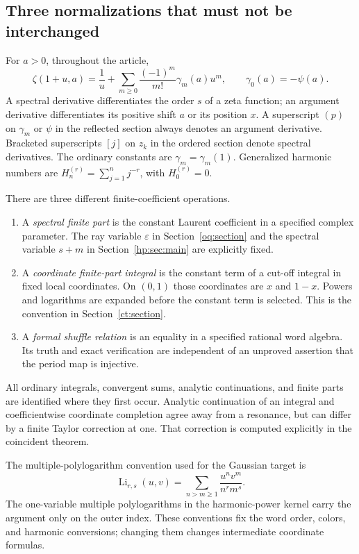 \subsection{Three normalizations that must not be interchanged}

For $a>0$, throughout the article,
\[
 \zeta(1+u,a)=\frac1u+
       \sum_{m\ge0}\frac{(-1)^m}{m!}\gamma_m(a)u^m,
 \qquad \gamma_0(a)=-\psi(a).
\]
A spectral derivative differentiates the order $s$ of a zeta function;
an argument derivative differentiates its positive shift $a$ or its
position $x$. A superscript $(p)$ on $\gamma_m$ or $\psi$ in the
reflected section always denotes an argument derivative. Bracketed
superscripts $[j]$ on $z_k$ in the ordered section denote spectral
derivatives. The ordinary constants are $\gamma_m=\gamma_m(1)$.
Generalized harmonic numbers are
$H_n^{(r)}=\sum_{j=1}^n j^{-r}$, with $H_0^{(r)}=0$.

There are three different finite-coefficient operations.
\begin{enumerate}
\item A \emph{spectral finite part} is the constant Laurent coefficient
in a specified complex parameter. The ray variable $\varepsilon$ in
Section~\ref{oq:section} and the spectral variable $s+m$ in
Section~\ref{hp:sec:main} are explicitly fixed.
\item A \emph{coordinate finite-part integral} is the constant term of
a cut-off integral in fixed local coordinates. On $(0,1)$ those
coordinates are $x$ and $1-x$. Powers and logarithms are expanded before
the constant term is selected. This is the convention in
Section~\ref{ct:section}.
\item A \emph{formal shuffle relation} is an equality in a specified
rational word algebra. Its truth and exact verification are independent
of an unproved assertion that the period map is injective.
\end{enumerate}
All ordinary integrals, convergent sums, analytic continuations, and
finite parts are identified where they first occur. Analytic continuation
of an integral and coefficientwise coordinate completion agree away
from a resonance, but can differ by a finite Taylor correction at one.
That correction is computed explicitly in the coincident theorem.

The multiple-polylogarithm convention used for the Gaussian target is
\[
 \operatorname{Li}_{r,s}(u,v)
 =\sum_{n>m\ge1}\frac{u^nv^m}{n^rm^s}.
\]
The one-variable multiple polylogarithms in the harmonic-power kernel
carry the argument only on the outer index. These conventions fix the
word order, colors, and harmonic conversions; changing them changes
intermediate coordinate formulas.

